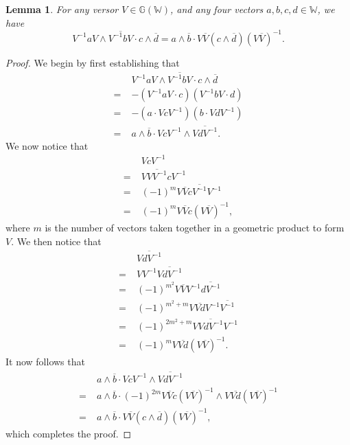 \documentclass{birkjour}
\newtheorem{lem}[thm]{Lemma}
\theoremstyle{definition}
\theoremstyle{remark}
\numberwithin{equation}{section}
\newcommand{\G}{\mathbb{G}}
\newcommand{\W}{\mathbb{W}}
\begin{document}
\begin{lem}\label{lma_versor_transfer}
For any versor $V\in\G(\W)$, and any four vectors $a,b,c,d\in\W$, we have
\begin{equation}
V^{-1}aV\wedge\overline{V^{-1}bV}\cdot c\wedge\overline{d} =
a\wedge\overline{b}\cdot V\overline{V}(c\wedge\overline{d})(V\overline{V})^{-1}.
\end{equation}
\end{lem}
\begin{proof}
We begin by first establishing that
\begin{align}
 & V^{-1}aV\wedge\overline{V^{-1}bV}\cdot c\wedge\overline{d} \\
=\;& -(V^{-1}aV\cdot c)(V^{-1}bV\cdot d)\label{equ_step_a_clarify} \\
=\;& -(a\cdot VcV^{-1})(b\cdot VdV^{-1})\label{equ_step_b_clarify} \\
=\;& a\wedge\overline{b}\cdot VcV^{-1}\wedge\overline{VdV^{-1}}.
\end{align}
We now notice that
\begin{align}
& VcV^{-1} \\
=\;& V\overline{VV^{-1}}cV^{-1} \\
=\;& (-1)^m V\overline{V}c\overline{V^{-1}}V^{-1} \\
=\;& (-1)^m V\overline{V}c(V\overline{V})^{-1},
\end{align}
where $m$ is the number of vectors taken together in a geometric
product to form $V$.  We then notice that
\begin{align}
& \overline{VdV^{-1}} \\
=\;& VV^{-1}\overline{VdV^{-1}} \\
=\;& (-1)^{m^2}V\overline{V}V^{-1}\overline{dV^{-1}} \\
=\;&(-1)^{m^2+m}V\overline{Vd}V^{-1}\overline{V^{-1}} \\
=\;&(-1)^{2m^2+m}V\overline{VdV^{-1}}V^{-1} \\
=\;&(-1)^mV\overline{Vd}(V\overline{V})^{-1}.
\end{align}
It now follows that
\begin{align}
 & a\wedge\overline{b}\cdot VcV^{-1}\wedge\overline{VdV^{-1}} \\
=\;& a\wedge\overline{b}\cdot (-1)^{2m}V\overline{V}c(V\overline{V})^{-1}\wedge V\overline{Vd}(V\overline{V})^{-1}\label{equ_step_c_clarify} \\
=\;& a\wedge\overline{b}\cdot V\overline{V}(c\wedge\overline{d})(V\overline{V})^{-1},\label{equ_step_d_clarify}
\end{align}
which completes the proof.
\end{proof}
\end{document}
